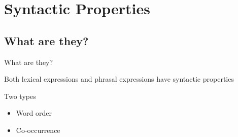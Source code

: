 \documentclass{beamer}
\subtitle[Syntactic Properties]{Syntactic Properties}
\newcommand{\suboneone}{What are they?}
\begin{document}
  

  \section{Syntactic Properties}
    \subsection{\suboneone}
      \begin{frame}{\suboneone}
        \begin{definition}
          
        \end{definition}
        \begin{alertblock}{}
          Both lexical expressions and phrasal expressions have syntactic properties
        \end{alertblock}
        \begin{block}{Two types}
          \begin{itemize}
            \item Word order
            \item Co-occurrence
          \end{itemize}
        \end{block}
      \end{frame}
\end{document}
